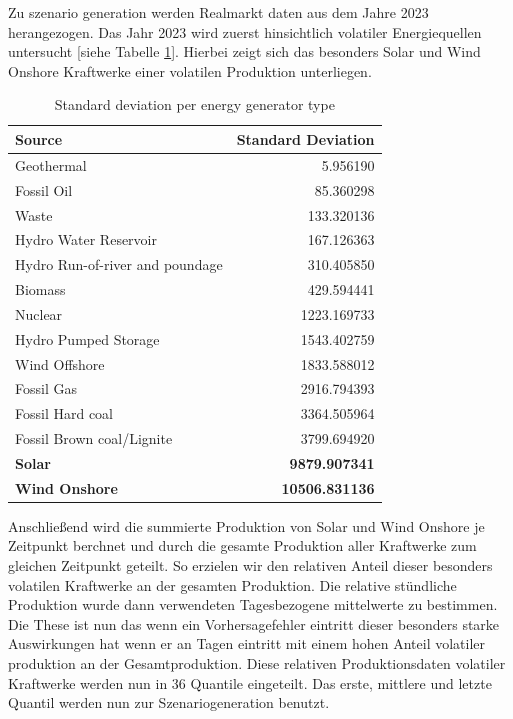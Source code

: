 Zu szenario generation werden Realmarkt daten aus dem Jahre 2023 herangezogen.
Das Jahr 2023 wird zuerst hinsichtlich volatiler Energiequellen untersucht [siehe Tabelle \ref{tab:energy_sources_std}].
Hierbei zeigt sich das besonders Solar und Wind Onshore Kraftwerke einer volatilen Produktion unterliegen.

\begin{table}[ht]
	\centering
	\begin{tabular}{|l|r|}
		\hline
		\textbf{Source}                 & \textbf{Standard Deviation} \\
		\hline
		Geothermal                      & 5.956190                    \\
		Fossil Oil                      & 85.360298                   \\
		Waste                           & 133.320136                  \\
		Hydro Water Reservoir           & 167.126363                  \\
		Hydro Run-of-river and poundage & 310.405850                  \\
		Biomass                         & 429.594441                  \\
		Nuclear                         & 1223.169733                 \\
		Hydro Pumped Storage            & 1543.402759                 \\
		Wind Offshore                   & 1833.588012                 \\
		Fossil Gas                      & 2916.794393                 \\
		Fossil Hard coal                & 3364.505964                 \\
		Fossil Brown coal/Lignite       & 3799.694920                 \\
		\textbf{Solar}                  & \textbf{9879.907341}        \\
		\textbf{Wind Onshore}           & \textbf{10506.831136}       \\
		\hline
	\end{tabular}
	\caption{Standard deviation per energy generator type}
	\label{tab:energy_sources_std}
\end{table}

Anschließend wird die summierte Produktion von Solar und Wind Onshore je Zeitpunkt berchnet und
durch die gesamte Produktion aller Kraftwerke zum gleichen Zeitpunkt geteilt. So erzielen wir den relativen
Anteil dieser besonders volatilen Kraftwerke an der gesamten Produktion. Die relative stündliche Produktion wurde dann verwendeten
Tagesbezogene mittelwerte zu bestimmen. Die These ist nun das wenn ein Vorhersagefehler eintritt
dieser besonders starke Auswirkungen hat wenn er an Tagen eintritt mit einem hohen Anteil volatiler produktion an der Gesamtproduktion.
Diese relativen Produktionsdaten volatiler Kraftwerke werden nun in 36 Quantile eingeteilt. Das erste, mittlere und letzte
Quantil werden nun zur Szenariogeneration benutzt.


